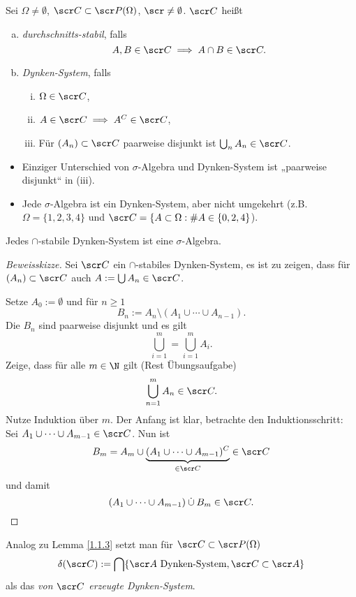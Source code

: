 \begin{df} \label{1.3.1}
	Sei $\Omega \neq \emptyset$, $\scr C \subset \scr P(\Omega)$, $\scr \neq \emptyset$.
	$\scr C$ heißt
	\begin{enumerate}[(a)]
		\item
			\emph{durchschnitts-stabil}, falls
			\[
				A,B \in \scr C
				\implies A \cap B \in \scr C.
			\]
		\item
			\emph{Dynken-System}, falls
			\begin{enumerate}[(i)]
				\item
					$\Omega \in \scr C$,
				\item
					$A \in \scr C \implies A^C \in \scr C$,
				\item
					Für $(A_n) \subset \scr C$ paarweise disjunkt ist $\bigcup_{n} A_n \in \scr C$.
			\end{enumerate}
	\end{enumerate}
	\begin{nt}
		\begin{itemize}
			\item
				Einziger Unterschied von $\sigma$-Algebra und Dynken-System ist „paarweise disjunkt“ in (iii).
			\item
				Jede $\sigma$-Algebra ist ein Dynken-System, aber nicht umgekehrt (z.B. $\Omega = \{1,2,3,4\}$ und $\scr C = \{A \subset \Omega : \#A \in \{0,2,4\}$).
		\end{itemize}
	\end{nt}
\end{df}

\begin{st} \label{1.2.2}
	Jedes $\cap$-stabile Dynken-System ist eine $\sigma$-Algebra.
	\begin{proof}[Beweisskizze]
		Sei $\scr C$ ein $\cap$-stabiles Dynken-System, es ist zu zeigen, dass für $(A_n) \subset \scr C$ auch $A := \bigcup A_n \in \scr C$.

		Setze $A_0 := \emptyset$ und für $n \ge 1$
		\[
			B_n := A_n \setminus ( A_1 \cup \dotsb \cup A_{n-1} ).
		\]
		Die $B_n$ sind paarweise disjunkt und es gilt
		\[
			\bigcup_{i=1}^m = \bigcup_{i=1}^m A_i.
		\]
		Zeige, dass für alle $m \in \N$ gilt (Rest Übungsaufgabe)
		\[
			\bigcup_{n=1}^m A_n \in \scr C.
		\]
		Nutze Induktion über $m$.
		Der Anfang ist klar, betrachte den Induktionsschritt:
		Sei $A_1 \cup \dotsb \cup A_{m-1} \in \scr C$.
		Nun ist
		\[
			B_m = A_m \cup \underbrace{( A_1 \cup \dotsb \cup A_{m-1} )^C}_{\in \scr C} \in \scr C
		\]
		und damit
		\[
			(A_1 \cup \dotsb \cup A_{m-1}) \cupdot B_m \in \scr C.
		\]
	\end{proof}
	\begin{nt*}
		Analog zu Lemma \ref{1.1.3} setzt man für $\scr C \subset \scr P(\Omega)$
		\[
			\delta(\scr C)
			:= \bigcap \{ \scr A \text{ Dynken-System}, \scr C \subset \scr A \}
		\]
		als das \emph{von $\scr C$ erzeugte Dynken-System}.
	\end{nt*}
\end{st}

